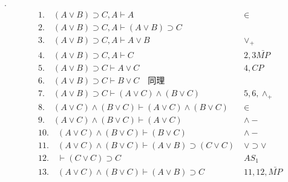 \documentclass[a4paper]{ctexart}
\begin{document}
.
\begin{align*}
  &1. \quad (A\vee B)\supset C,A \vdash A \quad & \in \\
  &2. \quad (A\vee B)\supset C,A \vdash (A\vee B)\supset C \quad & \\
  &3. \quad (A\vee B)\supset C,A \vdash A\vee B \quad &\vee_+ \\
  &4. \quad (A\vee B)\supset C,A \vdash C \quad &2,3\bar{MP} \\
  &5. \quad (A\vee B)\supset C \vdash A\vee C \quad &4,CP \\
  &6. \quad (A\vee B)\supset C \vdash B\vee C \quad \text{同理} \\
  &7. \quad (A\vee B)\supset C \vdash (A\vee C)\wedge (B\vee C)\quad &5,6,\wedge_+ \\
  &8. \quad (A\vee C)\wedge (B\vee C) \vdash (A\vee C)\wedge (B\vee C) \quad &\in \\
  &9. \quad (A\vee C)\wedge (B\vee C) \vdash (A\vee C) \quad &\wedge- \\
  &10. \quad (A\vee C)\wedge (B\vee C) \vdash (B\vee C) \quad &\wedge- \\
  &11. \quad (A\vee C)\wedge (B\vee C) \vdash (A\vee B)\supset(C\vee C) &\vee\supset\vee \\
  &12. \quad \vdash(C\vee C)\supset C \quad &AS_1 \\
  &13. \quad (A\vee C)\wedge (B\vee C) \vdash (A\vee B)\supset C &11,12,\bar{MP} \\
\end{align*}
\end{document}
